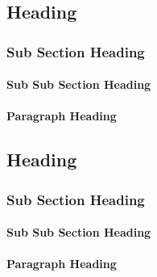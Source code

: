 
\subsection{Heading}

\subsubsection{Sub Section Heading}

\paragraph{Sub Sub Section Heading}

\paragraph{Paragraph Heading}

\subsection{Heading}

\subsubsection{Sub Section Heading}

\paragraph{Sub Sub Section Heading}

\paragraph{Paragraph Heading}
